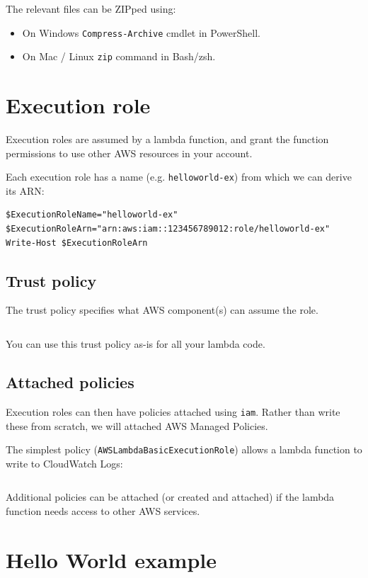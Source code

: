 \documentclass[slides]{pgnotes}
\begin{document}
The relevant files can be ZIPped using:
\begin{itemize}
\item On Windows \texttt{Compress-Archive} cmdlet in PowerShell.
\item On Mac / Linux \texttt{zip} command in Bash/zsh.
\end{itemize}

\section{Execution role}\label{execution-role}

Execution roles are assumed by a lambda function, and grant the function
permissions to use other AWS resources in your account.

Each execution role has a name (e.g. \texttt{helloworld-ex}) from which
we can derive its ARN:

\begin{verbatim}
$ExecutionRoleName="helloworld-ex"
$ExecutionRoleArn="arn:aws:iam::123456789012:role/helloworld-ex"
Write-Host $ExecutionRoleArn
\end{verbatim}

\subsection{Trust policy}\label{sec:trust-policy}

The trust policy specifies what AWS component(s) can assume the role.

\inputminted{json}{trust_policy.json}

You can use this trust policy as-is for all your lambda code. 

\subsection{Attached policies}\label{attached-policies}

Execution roles can then have policies attached using \texttt{iam}.
Rather than write these from scratch, we will attached AWS Managed
Policies.

\newpage
The simplest policy (\texttt{AWSLambdaBasicExecutionRole}) allows a lambda function to write to CloudWatch Logs:
\inputminted{json}{AWSLambdaBasicExecutionRole.json}
Additional policies can be attached (or created and attached) if the
lambda function needs access to other AWS services.

\section{Hello World example}\label{hello-world-example}
\end{document}
